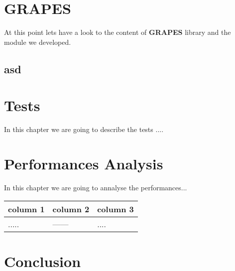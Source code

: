 \documentclass[12pt,a4paper]{report}
\begin{document}

\chapter{GRAPES}
\label{ch:grapes}
At this point lets have a look to the content of \textbf{GRAPES} library and the module we developed.

\section{asd}
\label{asd}


\chapter{Tests}
\label{ch:tests}
In this chapter we are going to describe the tests ....


\chapter{Performances Analysis}
In this chapter we are going to annalyse the performances...

\begin{center}
    \begin{tabular}{ | p{4.8cm} | p{4.8cm} | p{4.8cm} |}
    \hline
       \textbf{column 1}
         & \textbf{column 2}
         & \textbf{column 3}\\ \hline \hline
       .....
         & ------
         & .... \\ \hline
     \end{tabular}
\end{center}

\chapter{Conclusion}


\end{document}
